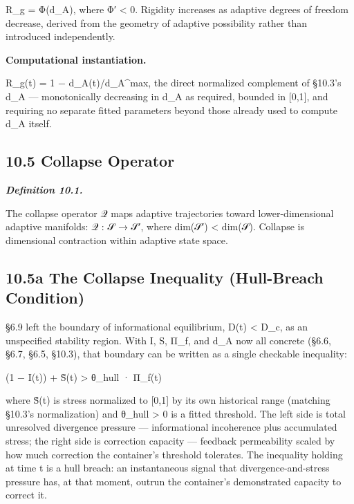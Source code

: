 \documentclass[
]{article}
\begin{document}
R\_g = Φ(d\_A), where Φ′ \textless{} 0. Rigidity increases as adaptive
degrees of freedom decrease, derived from the geometry of adaptive
possibility rather than introduced independently.

\textbf{Computational instantiation.}

R\_g(t) = 1 − d\_A(t)/d\_A\^{}max, the direct normalized complement of
§10.3's d\_A --- monotonically decreasing in d\_A as required, bounded
in {[}0,1{]}, and requiring no separate fitted parameters beyond those
already used to compute d\_A itself.

\hypertarget{collapse-operator}{%
\subsection{10.5 Collapse Operator}\label{collapse-operator}}

\emph{\textbf{Definition 10.1.}}

The collapse operator 𝒬 maps adaptive trajectories toward
lower-dimensional adaptive manifolds: 𝒬 : 𝒮 → 𝒮′, where dim(𝒮′)
\textless{} dim(𝒮). Collapse is dimensional contraction within adaptive
state space.

\hypertarget{a-the-collapse-inequality-hull-breach-condition}{%
\subsection{10.5a The Collapse Inequality (Hull-Breach
Condition)}\label{a-the-collapse-inequality-hull-breach-condition}}

§6.9 left the boundary of informational equilibrium, D(t) \textless{}
D\_c, as an unspecified stability region. With I, S, Π\_f, and d\_A now
all concrete (§6.6, §6.7, §6.5, §10.3), that boundary can be written as
a single checkable inequality:

(1 − I(t)) + S̃(t) \textgreater{} θ\_hull · Π\_f(t)

where S̃(t) is stress normalized to {[}0,1{]} by its own historical range
(matching §10.3's normalization) and θ\_hull \textgreater{} 0 is a
fitted threshold. The left side is total unresolved divergence pressure
--- informational incoherence plus accumulated stress; the right side is
correction capacity --- feedback permeability scaled by how much
correction the container's threshold tolerates. The inequality holding
at time t is a hull breach: an instantaneous signal that
divergence-and-stress pressure has, at that moment, outrun the
container's demonstrated capacity to correct it.
\end{document}
